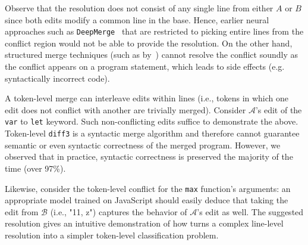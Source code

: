 Observe that the resolution does not consist of any single line from either $A$ or $B$ since both edits modify a common line in the base.
Hence, earlier neural approaches such as \texttt{DeepMerge}~\citep{Dinella2021} that are restricted to picking entire lines from the conflict region would not be able to provide the resolution. 
On the other hand, structured merge techniques (such as \jsfstmerge by~\cite{tavares2019javascript}) cannot resolve the conflict soundly as the conflict appears on a program statement, which leads to side effects (e.g. syntactically incorrect code).

A token-level merge can interleave edits within lines (i.e., tokens in which one edit does not conflict with another are trivially merged). Consider $\mathcal{A}$'s edit of the \texttt{var} to \texttt{let} keyword.  
Such non-conflicting edits suffice to demonstrate the above.
Token-level \texttt{diff3} is a syntactic merge algorithm and therefore cannot guarantee semantic or even syntactic correctness of the merged program. 
However, we observed that in practice, syntactic correctness is preserved the majority of the time (over 97\%).%

Likewise, consider the token-level conflict for the \texttt{max} function's arguments: an appropriate model trained on JavaScript should easily deduce that taking the edit from $\mathcal{B}$ (i.e., "11, z")  captures the behavior of $\mathcal{A}$'s edit as well. 
The suggested resolution gives an intuitive demonstration of how \thistool{} turns a complex line-level resolution into a simpler token-level classification problem.
